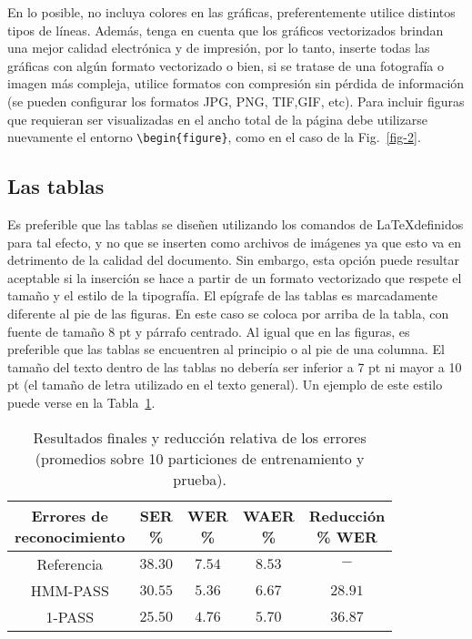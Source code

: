 \documentclass[esp]{FCEFyN-class}
\begin{document}
En lo posible, no incluya colores en las gráficas, preferentemente utilice distintos tipos de líneas.
Además, tenga en cuenta que los gráficos vectorizados brindan una mejor calidad electrónica y de
impresión, por lo tanto, inserte todas las gráficas con algún formato vectorizado o bien, si se
tratase de una fotografía o imagen más compleja, utilice formatos con compresión sin pérdida de
información (se pueden configurar los formatos JPG, PNG, TIF,GIF, etc).
Para incluir figuras que requieran ser visualizadas en el ancho total de la página debe utilizarse
nuevamente el entorno \verb!\begin{figure*}!, como en el caso de la Fig.~\ref{fig-2}.


\subsection{Las tablas}
Es preferible que las tablas se diseñen utilizando los comandos de \LaTeX definidos para tal efecto,
y no que se inserten como archivos de imágenes ya que esto va en detrimento de la calidad del
documento. Sin embargo, esta opción puede resultar aceptable si la inserción se hace a partir de un
formato vectorizado que respete el tamaño y el estilo de la tipografía.
El epígrafe de las tablas es marcadamente diferente al pie de las figuras. En este caso se coloca por
arriba de la tabla, con fuente de tamaño 8 pt y párrafo centrado.
Al igual que en las figuras, es preferible que las tablas se encuentren al principio o al pie de una
columna. El tamaño del texto dentro de las tablas no debería ser inferior a 7 pt ni mayor a 10 pt (el
tamaño de letra utilizado en el texto general).
Un ejemplo de este estilo puede verse en la Tabla~\ref{tabla-1}.

\begin{table}[!b]
 \centering
  \caption{Resultados finales y reducción relativa de los errores (promedios sobre 10 particiones de
 entrenamiento y prueba).} \label{tabla-1}
 {\small
 \begin{tabular}{ccccc}
  \hline
  \hline
  \thead{Errores de \\ reconocimiento} & \thead{SER \\ \%} & \thead{WER \\ \%} & \thead{WAER \\ \%} &
                        \thead{Reducción \\ \% WER} \\
  \hline
  \hline
  Referencia & $38.30$ & $7.54$ & $8.53$ & $-$ \\
  \hline
  HMM-PASS & $30.55$ & $5.36$ & $6.67$ & $28.91$ \\
  1-PASS & $25.50$ & $4.76$ & $5.70$ & $36.87$   \\
  \hline
  \hline
 \end{tabular}}
\end{table}
\end{document}
